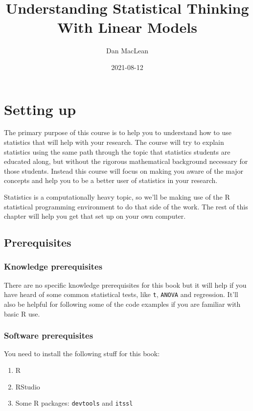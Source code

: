 \documentclass[
]{book}
\title{Understanding Statistical Thinking With Linear Models}
\author{Dan MacLean}
\date{2021-08-12}
\providecommand{\tightlist}{%
  \setlength{\itemsep}{0pt}\setlength{\parskip}{0pt}}
\begin{document}
\maketitle

{
\setcounter{tocdepth}{1}
\tableofcontents
}
\hypertarget{setting-up}{%
\chapter{Setting up}\label{setting-up}}

The primary purpose of this course is to help you to understand how to use statistics that will help with your research. The course will try to explain statistics using the same path through the topic that statistics students are educated along, but without the rigorous mathematical background necessary for those students. Instead this course will focus on making you aware of the major concepts and help you to be a better user of statistics in your research.

Statistics is a computationally heavy topic, so we'll be making use of the R statistical programming environment to do that side of the work. The rest of this chapter will help you get that set up on your own computer.

\hypertarget{prerequisites}{%
\section{Prerequisites}\label{prerequisites}}

\hypertarget{knowledge-prerequisites}{%
\subsection{Knowledge prerequisites}\label{knowledge-prerequisites}}

There are no specific knowledge prerequisites for this book but it will help if you have heard of some common statistical tests, like \texttt{t}, \texttt{ANOVA} and regression. It'll also be helpful for following some of the code examples if you are familiar with basic R use.

\hypertarget{software-prerequisites}{%
\subsection{Software prerequisites}\label{software-prerequisites}}

You need to install the following stuff for this book:

\begin{enumerate}
\def\labelenumi{\arabic{enumi}.}
\tightlist
\item
  R
\item
  RStudio
\item
  Some R packages: \texttt{devtools} and \texttt{itssl}
\end{enumerate}
\end{document}
